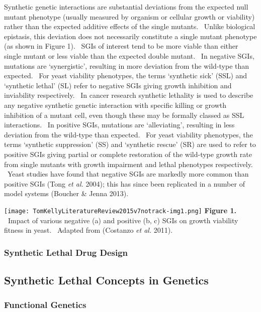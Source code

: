 Synthetic genetic interactions are substantial deviations from the expected null mutant phenotype (usually measured by organism or cellular growth or viability) rather than the expected additive effects of the single mutants. \ Unlike biological epistasis, this deviation does not necessarily constitute a single mutant phenotype (as shown in Figure 1). \ SGIs of interest tend to be more viable than either single mutant or less viable than the expected double mutant. \ In negative SGIs, mutations are {\textquoteleft}synergistic{\textquoteright}, resulting in more deviation from the wild-type than expected. \ For yeast viability phenotypes, the terms {\textquoteleft}synthetic sick{\textquoteright} (SSL) and {\textquoteleft}synthetic lethal{\textquoteright} (SL) refer to negative SGIs giving growth inhibition and inviability respectively. \ In cancer research synthetic lethality is used to describe any negative synthetic genetic interaction with specific killing or growth inhibition of a mutant cell, even though these may be formally classed as SSL interactions. \ In positive SGIs, mutations are {\textquoteleft}alleviating{\textquoteright}, resulting in less deviation from the wild-type than expected. \ For yeast viability phenotypes, the terms {\textquoteleft}synthetic suppression{\textquoteright} (SS) and {\textquoteleft}synthetic rescue{\textquoteright} (SR) are used to refer to positive SGIs giving partial or complete restoration of the wild-type growth rate from single mutants with growth impairment and lethal phenotypes respectively. \ Yeast studies have found that negative SGIs are markedly more common than positive SGIs (Tong\textit{ et al.} 2004); this has since been replicated in a number of model systems (Boucher \& Jenna 2013). \ 


\texttt{[image: TomKellyLiteratureReview2015v7notrack-img1.png]}
\textbf{Figure 1. \ }Impact of various negative (a) and positive (b, c) SGIs on growth viability fitness in yeast. \ Adapted from (Costanzo\textit{ et al.} 2011). \ 

\subsubsection{Synthetic Lethal Drug Design}

\subsection{Synthetic Lethal Concepts in Genetics}
\subsubsection{Functional Genetics}
